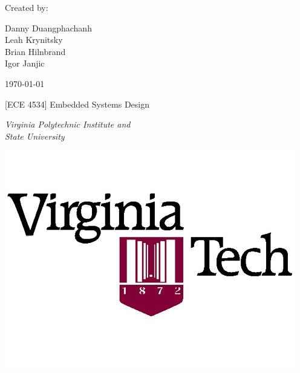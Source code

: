 \begin{titlepage}
\vfill

Created by:\\[0.3\baselineskip]
{Danny Duangphachanh\\ Leah Krynitsky\\ Brian Hilnbrand\\ Igor Janjic\par}
{\small \today\\\par}
{\small [ECE 4534] Embedded Systems Design\\\par}
{\small\itshape Virginia Polytechnic Institute and\\ State University\par}

\begin{center}
	\includegraphics[scale=0.35]{Images/Logo}
\end{center}

\end{titlepage}
